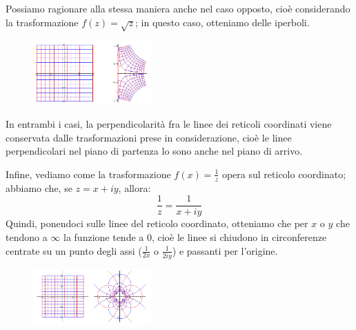 Possiamo ragionare alla stessa maniera anche nel caso opposto, cioè considerando la trasformazione $f(z)=\sqrt{z}$; in questo caso, otteniamo delle iperboli.

\begin{figure}[h!]
  \centering
    \includegraphics[width=0.4\textwidth]{immagini/quadrattto.png}
\end{figure}

In entrambi i casi, la perpendicolarità fra le linee dei reticoli coordinati viene conservata dalle trasformazioni prese in considerazione, cioè le linee perpendicolari nel piano di partenza lo sono anche nel piano di arrivo.

Infine, vediamo come la trasformazione $f(x)=\frac{1}{z}$ opera sul reticolo coordinato; abbiamo che, se $z=x+iy$, allora:
$$\frac{1}{z}=\frac{1}{x+iy}$$
Quindi, ponendoci sulle linee del reticolo coordinato, otteniamo che per $x$ o $y$ che tendono a $\infty$ la funzione tende a 0, cioè le linee si chiudono in circonferenze centrate su un punto degli assi ($\frac{1}{2x}$ o $ \frac{1}{2iy}$) e  passanti per l'origine.

\begin{figure}[h!]
  \centering
    \includegraphics[width=0.4\textwidth]{immagini/inverso.png}
\end{figure}

